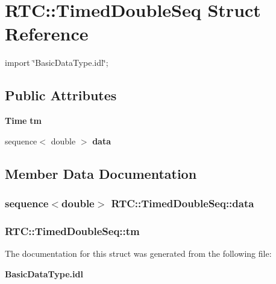 \section{RTC::TimedDoubleSeq Struct Reference}
\label{structRTC_1_1TimedDoubleSeq}


{\ttfamily import \char`\"{}BasicDataType.idl\char`\"{};}

\subsection*{Public Attributes}
\begin{DoxyCompactItemize}
\item 
{\bf Time} {\bf tm}
\item 
sequence$<$ double $>$ {\bf data}
\end{DoxyCompactItemize}


\subsection{Member Data Documentation}
\subsubsection[{data}]{\setlength{\rightskip}{0pt plus 5cm}sequence$<$double$>$ {\bf RTC::TimedDoubleSeq::data}}\label{structRTC_1_1TimedDoubleSeq_ac1f55e29d8e54d08da33d6d81c6309fc}
\subsubsection[{tm}]{ {\bf RTC::TimedDoubleSeq::tm}}\label{structRTC_1_1TimedDoubleSeq_aa157419b7a22afc914c73e6958003925}


The documentation for this struct was generated from the following file:\begin{DoxyCompactItemize}
\item 
{\bf BasicDataType.idl}\end{DoxyCompactItemize}

